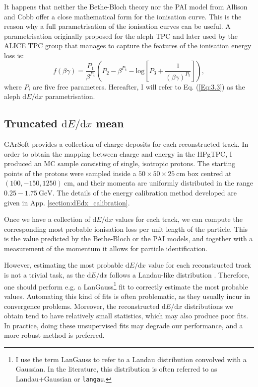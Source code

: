 It happens that neither the Bethe-Bloch theory nor the PAI model from Allison and Cobb offer a close mathematical form for the ionisation curve. This is the reason why a full parametrisation of the ionisation curves can be useful. A parametrisation originally proposed for the \gls{aleph} TPC \cite{Blum2008} and later used by the ALICE TPC \cite{ALICETPC2013} group that manages to capture the features of the ionisation energy loss is:
\begin{equation}\label{Eq:3.3}
    f(\beta\gamma) = \frac{P_{1}}{\beta^{P_{4}}}\left(P_{2}-\beta^{P_{4}}-\mathrm{log}\left[P_{3}+\frac{1}{(\beta\gamma)^{P_{5}}}\right]\right),
\end{equation}
where $P_{i}$ are five free parameters. Hereafter, I will refer to Eq. (\ref{Eq:3.3}) as the \gls{aleph} $\mathrm{d}E/\mathrm{d}x$ parametrisation.

\subsection[Truncated \texorpdfstring{$\mathrm{d}E/\mathrm{d}x$}{dE/dx} mean]{Truncated \boldmath\texorpdfstring{$\mathrm{d}E/\mathrm{d}x$}{dE/dx} mean} \label{subsec:mean_dEdx}

GArSoft provides a collection of charge deposits for each reconstructed track. In order to obtain the mapping between charge and energy in the HPgTPC, I produced an MC sample consisting of single, isotropic protons. The starting points of the protons were sampled inside a $50\times50\times25 \ \mathrm{cm}$ box centred at $(100, -150, 1250)~\mathrm{cm}$, and their momenta are uniformly distributed in the range $0.25 - 1.75 ~ \mathrm{GeV}$. The details of the energy calibration method developed are given in App. \ref{section:dEdx_calibration}.

Once we have a collection of $\mathrm{d}E/\mathrm{d}x$ values for each track, we can compute the corresponding most probable ionisation loss per unit length of the particle. This is the value predicted by the Bethe-Bloch or the PAI models, and together with a measurement of the momentum it allows for particle identification.

However, estimating the most probable $\mathrm{d}E/\mathrm{d}x$ value for each reconstructed track is not a trivial task, as the $\mathrm{d}E/\mathrm{d}x$ follows a Landau-like distribution \cite{Landau1944}. Therefore, one should perform e.g. a LanGauss\footnote{I use the term LanGauss to refer to a Landau distribution convolved with a Gaussian. In the literature, this distribution is often referred to as Landau+Gaussian or \texttt{langau}.} fit to correctly estimate the most probable values. Automating this kind of fits is often problematic, as they usually incur in convergence problems. Moreover, the reconstructed $\mathrm{d}E/\mathrm{d}x$ distributions we obtain tend to have relatively small statistics, which may also produce poor fits. In practice, doing these unsupervised fits may degrade our performance, and a more robust method is preferred.

